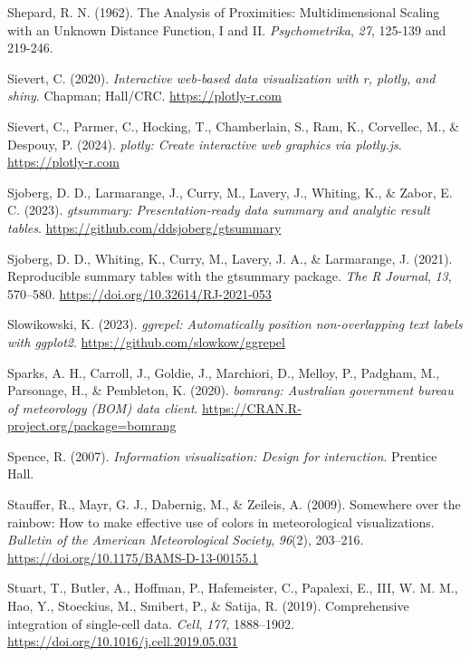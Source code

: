 \documentclass[
  letterpaper,
]{krantz}
\newlength{\cslhangindent}
\newenvironment{CSLReferences}[2] %
 {\begin{list}{}{%
  \setlength{\itemindent}{0pt}
  \setlength{\leftmargin}{0pt}
  \setlength{\parsep}{0pt}
  \ifodd #1
   \setlength{\leftmargin}{\cslhangindent}
   \setlength{\itemindent}{-1\cslhangindent}
  \fi
  \setlength{\itemsep}{#2\baselineskip}}}
 {\end{list}}
\begin{document}
\begin{CSLReferences}{1}{0}
Shepard, R. N. (1962). The {A}nalysis of {P}roximities:
{M}ultidimensional {S}caling with an {U}nknown {D}istance {F}unction,
{I} and {II}. \emph{Psychometrika}, \emph{27}, 125-139 and 219-246.

Sievert, C. (2020). \emph{Interactive web-based data visualization with
r, plotly, and shiny}. Chapman; Hall/CRC. \url{https://plotly-r.com}

Sievert, C., Parmer, C., Hocking, T., Chamberlain, S., Ram, K.,
Corvellec, M., \& Despouy, P. (2024). \emph{{plotly}: Create interactive
web graphics via plotly.js}. \url{https://plotly-r.com}

Sjoberg, D. D., Larmarange, J., Curry, M., Lavery, J., Whiting, K., \&
Zabor, E. C. (2023). \emph{{gtsummary}: Presentation-ready data summary
and analytic result tables}.
\url{https://github.com/ddsjoberg/gtsummary}

Sjoberg, D. D., Whiting, K., Curry, M., Lavery, J. A., \& Larmarange, J.
(2021). Reproducible summary tables with the {gtsummary} package.
\emph{{The R Journal}}, \emph{13}, 570--580.
\url{https://doi.org/10.32614/RJ-2021-053}

Slowikowski, K. (2023). \emph{{ggrepel}: Automatically position
non-overlapping text labels with ggplot2}.
\url{https://github.com/slowkow/ggrepel}

Sparks, A. H., Carroll, J., Goldie, J., Marchiori, D., Melloy, P.,
Padgham, M., Parsonage, H., \& Pembleton, K. (2020). \emph{{bomrang}:
Australian government bureau of meteorology (BOM) data client}.
\url{https://CRAN.R-project.org/package=bomrang}

Spence, R. (2007). \emph{Information visualization: Design for
interaction}. Prentice Hall.

Stauffer, R., Mayr, G. J., Dabernig, M., \& Zeileis, A. (2009).
Somewhere over the rainbow: How to make effective use of colors in
meteorological visualizations. \emph{Bulletin of the American
Meteorological Society}, \emph{96}(2), 203--216.
\url{https://doi.org/10.1175/BAMS-D-13-00155.1}

Stuart, T., Butler, A., Hoffman, P., Hafemeister, C., Papalexi, E., III,
W. M. M., Hao, Y., Stoeckius, M., Smibert, P., \& Satija, R. (2019).
Comprehensive integration of single-cell data. \emph{Cell}, \emph{177},
1888--1902. \url{https://doi.org/10.1016/j.cell.2019.05.031}


\end{CSLReferences}
\end{document}

